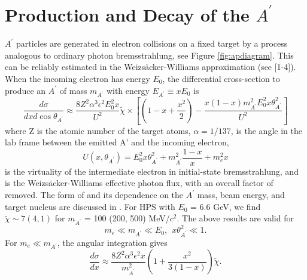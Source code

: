 \section{Production and Decay of the $A^\prime$}
\label{app:ProdAndDecay}

\def \ap {A^\prime}
\def \map {m_{A^\prime}}
\def \thap {\theta_{A^\prime}}


$\ap$ particles are generated in electron collisions on a fixed target by a process analogous to ordinary photon bremsstrahlung, see Figure \ref{fig:apdiagram}.  This can be reliably estimated in the Weizs\"acker-Williams approximation (see [1-4]).  When the incoming electron has energy $E_0$, the differential cross-section to produce an $\ap$ of mass $m_{\ap}$ with energy $E_{\ap}\equiv x E_0$ is 
\begin{equation}
\frac{d\sigma}{dxd\cos{\theta_{\ap}}}\approx \frac{8Z^2\alpha^3\epsilon^2 E_0^2 x}{U^2}\tilde{\chi}\times\left[\left(1-x+\frac{x^2}{2}\right)-\frac{x(1-x)m_{\ap}^2E_0^2x\theta_{\ap}^2}{U^2}\right]
\end{equation}
where Z is the atomic number of the target atoms, $\alpha = 1/137$,  is the angle in the lab frame between the emitted A' and the incoming electron, 
\begin{equation}
U(x,\theta_{\ap})=E_0^2x\theta_{\ap}^2+m_{\ap}^2\frac{1-x}{x}+m_e^2x
\label{eq:u}
\end{equation}
is the virtuality of the intermediate electron in initial-state bremsstrahlung, and  is the Weizs\"acker-Williams effective photon flux, with an overall factor of  removed.  The form of  and its dependence on the $\ap$ mass, beam energy, and target nucleus are discussed in \cite{Kim:1973he}.  For HPS with $E_0$ = 6.6 GeV, we find $\tilde{\chi}\sim 7 (4, 1)$ for $m_{\ap}$ = 100 (200, 500) MeV/$c^2$.
The above results are valid for 
\begin{equation}
m_e\ll m_{\ap}\ll E_0  , ~~ x\theta_{\ap}^2\ll 1.
\end{equation}
For $m_e\ll m_{\ap}$, the angular integration gives
\begin{equation}
\frac{d\sigma}{dx}\approx \frac{8Z^2\alpha^3\epsilon^2 x}{m_{\ap}^2}\left(1+\frac{x^2}{3(1-x)}\right)\tilde{\chi} .
\end{equation}

